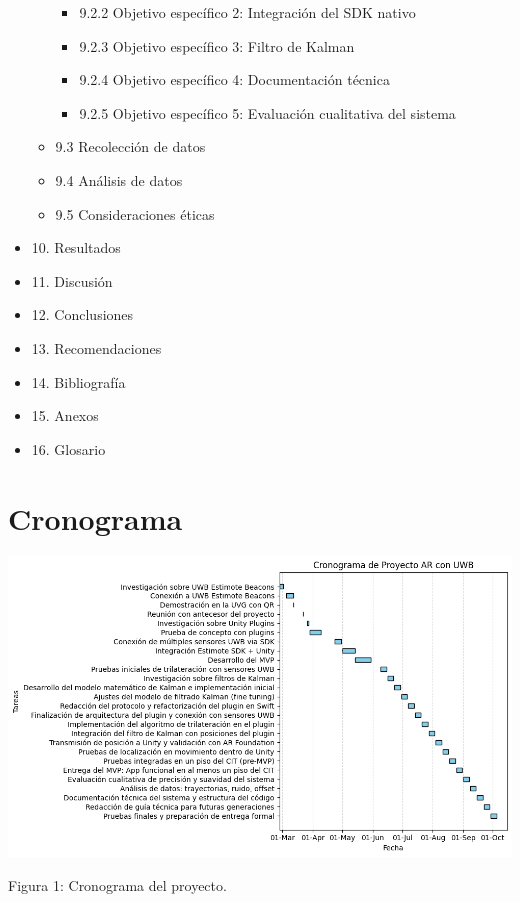 \documentclass{article}
\begin{document}
\begin{itemize}
\begin{itemize}
\begin{itemize}
      \item 9.2.2 Objetivo específico 2: Integración del SDK nativo
      \item 9.2.3 Objetivo específico 3: Filtro de Kalman
      \item 9.2.4 Objetivo específico 4: Documentación técnica
      \item 9.2.5 Objetivo específico 5: Evaluación cualitativa del sistema
    \end{itemize}
    \item 9.3 Recolección de datos
    \item 9.4 Análisis de datos
    \item 9.5 Consideraciones éticas
  \end{itemize}  
  \item 10. Resultados
  \item 11. Discusión
  \item 12. Conclusiones
  \item 13. Recomendaciones
  \item 14. Bibliografía
  \item 15. Anexos
  \item 16. Glosario
\end{itemize}
\newpage

\section{Cronograma}

\vspace{15mm} 
\includegraphics[width=1\textwidth]{images/cronograma3.png}
{\begin{center}
    Figura 1: Cronograma del proyecto.
\end{center}}
\newpage
\end{document}

